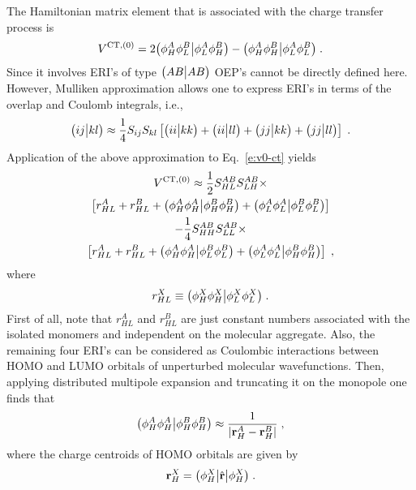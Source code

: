 The Hamiltonian matrix element that is associated with the charge transfer process
is
%
\begin{equation}\label{e:v0-ct}
 V^{{\rm CT },(0)} = 
     2 \bigl( {\phi_H^A \phi_L^B} \bigl\lvert {\phi_L^A \phi_H^B} \bigr)
      -\bigl( {\phi_H^A \phi_H^B} \bigl\lvert {\phi_L^A \phi_L^B} \bigr) \;.
\end{equation}
%
Since it involves ERI's of type $\bigl( {AB} \bigl\lvert {AB} \bigr)$ OEP's cannot be directly defined here.
However, Mulliken approximation allows one to express ERI's in terms of the
overlap and Coulomb integrals, i.e.,
%
\begin{equation}
 \bigl( {ij} \bigl\lvert {kl} \bigr) \approx \frac{1}{4} S_{ij}S_{kl}
 \left[ \bigl( {ii} \bigl\lvert {kk} \bigr) + \bigl( {ii} \bigl\lvert {ll} \bigr) + \bigl( {jj} \bigl\lvert {kk} \bigr) + \bigl( {jj} \bigl\lvert {ll} \bigr)\right] \;.
\end{equation}
%
Application of the above approximation to Eq.~\eqref{e:v0-ct} yields
%
\begin{multline}\label{e:v0-ct.mulliken}
 V^{{\rm CT },(0)} \approx \frac{1}{2} S_{HL}^{AB} S_{LH}^{AB} \times \\
  \left[ r_{HL}^A + r_{HL}^B + \bigl( {\phi_H^A \phi_H^A} \bigl\lvert {\phi_H^B \phi_H^B} \bigr) 
                             + \bigl( {\phi_L^A \phi_L^A} \bigl\lvert {\phi_L^B \phi_L^B} \bigr)\right] \\
 -\frac{1}{4} S_{HH}^{AB} S_{LL}^{AB} \times \\
  \left[ r_{HL}^A + r_{HL}^B + \bigl( {\phi_H^A \phi_H^A} \bigl\lvert {\phi_L^B \phi_L^B} \bigr) 
                             + \bigl( {\phi_L^A \phi_L^A} \bigl\lvert {\phi_H^B \phi_H^B} \bigr)\right]  \;,
\end{multline}
%
where 
%
\begin{equation} 
 r_{HL}^X \equiv \bigl( {\phi_H^X \phi_H^X} \bigl\lvert {\phi_L^X \phi_L^X} \bigr) \;.
\end{equation}
%
First of all, note that $r_{HL}^A$ and $r_{HL}^B$ are just constant numbers
associated with the isolated monomers and 
independent on the molecular aggregate. Also, the remaining four ERI's
can be considered as Coulombic interactions between HOMO and LUMO orbitals
of unperturbed molecular wavefunctions.
Then, applying distributed multipole expansion and truncating it on the monopole
one finds that
%
\begin{equation} 
 \bigl( {\phi_H^A \phi_H^A} \bigl\lvert {\phi_H^B \phi_H^B} \bigr) \approx \frac{1}{\vert {\bf r}_H^A - {\bf r}_H^B \vert} \;,
\end{equation}
%
where the charge centroids of HOMO orbitals are given by
%
\begin{equation} 
 {\bf r}_H^X = \bigl( {\phi_H^X} \bigl\lvert {\hat{\bf r}} \bigl\lvert {\phi_H^X} \bigr) \;.
\end{equation}
